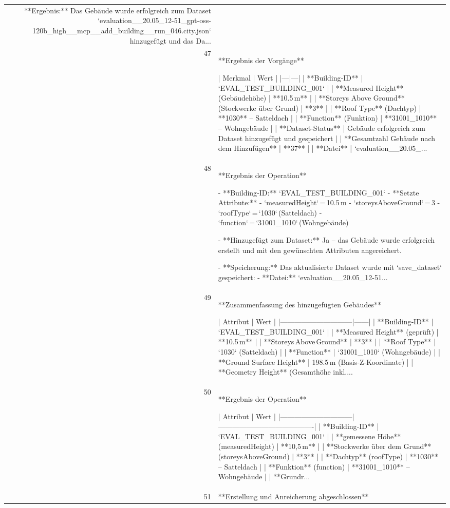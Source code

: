 \documentclass[a4paper,11pt]{article}
\begin{document}
\begin{table}[ht]
\begin{tabular}{r p{12cm}}
**Ergebnis:** Das Gebäude wurde erfolgreich zum Dataset `evaluation\_\_20.05\_12-51\_gpt-oss-120b\_high\_\_mcp\_\_add\_building\_\_run\_046.city.json` hinzugefügt und das Da... \\
47 & **Ergebnis der Vorgänge**

| Merkmal | Wert |
|---|---|
| **Building‑ID** | `EVAL\_TEST\_BUILDING\_001` |
| **Measured Height** (Gebäudehöhe) | **10.5 m** |
| **Storeys Above Ground** (Stockwerke über Grund) | **3** |
| **Roof Type** (Dachtyp) | **1030** – Satteldach |
| **Function** (Funktion) | **31001\_1010** – Wohngebäude |
| **Dataset‑Status** | Gebäude erfolgreich zum Dataset hinzugefügt und gespeichert |
| **Gesamtzahl Gebäude nach dem Hinzufügen** | **37** |
| **Datei** | `evaluation\_\_20.05\_... \\
48 & **Ergebnis der Operation**

- **Building‑ID:** `EVAL\_TEST\_BUILDING\_001`  
- **Setzte Attribute:**  
  - `measuredHeight` = 10.5 m  
  - `storeysAboveGround` = 3  
  - `roofType` = `1030` (Satteldach)  
  - `function` = `31001\_1010` (Wohngebäude)  

- **Hinzugefügt zum Dataset:** Ja – das Gebäude wurde erfolgreich erstellt und mit den gewünschten Attributen angereichert.  

- **Speicherung:** Das aktualisierte Dataset wurde mit `save\_dataset` gespeichert:  
  - **Datei:** `evaluation\_\_20.05\_12-51... \\
49 & **Zusammenfassung des hinzugefügten Gebäudes**

| Attribut                     | Wert |
|------------------------------|------|
| **Building‑ID**              | `EVAL\_TEST\_BUILDING\_001` |
| **Measured Height** (geprüft) | **10.5 m** |
| **Storeys Above Ground**      | **3** |
| **Roof Type**                 | `1030` (Satteldach) |
| **Function**                  | `31001\_1010` (Wohngebäude) |
| **Ground Surface Height**     | 198.5 m (Basis‑Z‑Koordinate) |
| **Geometry Height** (Gesamthöhe inkl.... \\
50 & **Ergebnis der Operation**  

| Attribut                     | Wert                                   |
|------------------------------|----------------------------------------|
| **Building‑ID**              | `EVAL\_TEST\_BUILDING\_001`                |
| **gemessene Höhe** (measuredHeight) | **10,5 m** |
| **Stockwerke über dem Grund** (storeysAboveGround) | **3** |
| **Dachtyp** (roofType)       | **1030** – Satteldach |
| **Funktion** (function)      | **31001\_1010** – Wohngebäude |
| **Grundr... \\
51 & **Erstellung und Anreicherung abgeschlossen**


\end{tabular}
\end{table}
\end{document}
